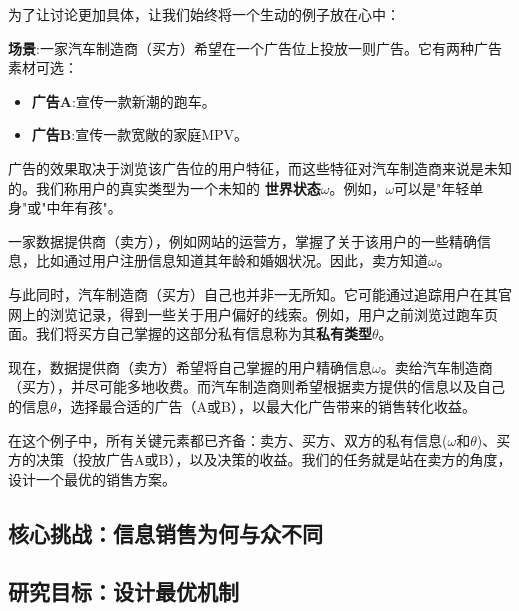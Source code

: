 为了让讨论更加具体，让我们始终将一个生动的例子放在心中：

\textbf{场景}:一家汽车制造商（买方）希望在一个广告位上投放一则广告。它有两种广告素材可选：
\begin{itemize}
   \item \textbf{广告A}:宣传一款新潮的跑车。
   \item \textbf{广告B}:宣传一款宽敞的家庭MPV。
\end{itemize}

广告的效果取决于浏览该广告位的用户特征，而这些特征对汽车制造商来说是未知的。我们称用户的真实类型为一个未知的
\textbf{世界状态}$\omega$。例如，$\omega$可以是"年轻单身"或"中年有孩"。

一家数据提供商（卖方），例如网站的运营方，掌握了关于该用户的一些精确信息，比如通过用户注册信息知道其年龄和婚姻状况。因此，卖方知道$\omega$。

与此同时，汽车制造商（买方）自己也并非一无所知。它可能通过追踪用户在其官网上的浏览记录，得到一些关于用户偏好的线索。例如，用户之前浏览过跑车页面。我们将买方自己掌握的这部分私有信息称为其\textbf{私有类型}$\theta$。

现在，数据提供商（卖方）希望将自己掌握的用户精确信息$\omega$。卖给汽车制造商（买方），并尽可能多地收费。而汽车制造商则希望根据卖方提供的信息以及自己的信息$\theta$，选择最合适的广告（A或B），以最大化广告带来的销售转化收益。

在这个例子中，所有关键元素都已齐备：卖方、买方、双方的私有信息($\omega$和$\theta$)、买方的决策（投放广告A或B），以及决策的收益。我们的任务就是站在卖方的角度，设计一个最优的销售方案。

\subsection{核心挑战：信息销售为何与众不同}

\subsection{研究目标：设计最优机制}